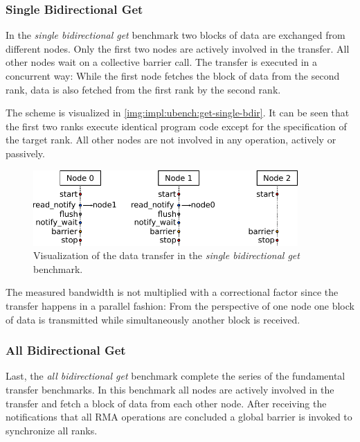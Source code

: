 \subsubsection*{Single Bidirectional Get}

In the \emph{single bidirectional get} benchmark two blocks of data are exchanged from different nodes. Only the first two nodes are actively involved in the transfer. All other nodes wait on a collective barrier call. The transfer is executed in a concurrent way: While the first node fetches the block of data from the second rank, data is also fetched from the first rank by the second rank.

The scheme is visualized in \autoref{img:impl:ubench:get-single-bdir}. It can be seen that the first two ranks execute identical program code except for the specification of the target rank. All other nodes are not involved in any operation, actively or passively.

\begin{figure}[htb]
\centering
\includegraphics[width=0.9\textwidth]{img/bench-get-single-bdir}
\caption{Visualization of the data transfer in the \emph{single bidirectional get} benchmark.}
\label{img:impl:ubench:get-single-bdir}
\end{figure}

The measured bandwidth is not multiplied with a correctional factor since the transfer happens in a parallel fashion: From the perspective of one node one block of data is transmitted while simultaneously another block is received.


\subsubsection*{All Bidirectional Get}

Last, the \emph{all bidirectional get} benchmark complete the series of the fundamental transfer benchmarks. In this benchmark all nodes are actively involved in the transfer and fetch a block of data from each other node. After receiving the notifications that all \ac{RMA} operations are concluded a global barrier is invoked to synchronize all ranks. 

